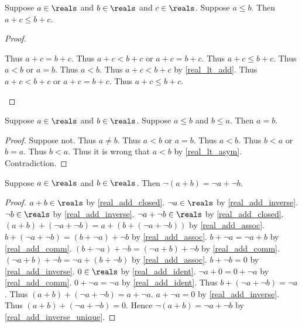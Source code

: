 \begin{lemma}\label{real_leq_add}
    Suppose $a\in\reals$ and $b\in\reals$ and $c\in\reals$.
    Suppose $a \leq b$.
    Then $a + c \leq b + c$.
\end{lemma}
\begin{proof}
    \begin{byCase}
        Thus $a + c = b + c$.
        Thus $a + c < b + c$ or $a + c = b + c$.
        Thus $a + c \leq b + c$.
        Thus $a < b$ or $a = b$.
        Thus $a < b$.
        Thus $a + c < b + c$ by \cref{real_lt_add}.
        Thus $a + c < b + c$ or $a + c = b + c$.
        Thus $a + c \leq b + c$.
    \end{byCase}
\end{proof}

\begin{lemma}\label{real_leq_antisym}
    Suppose $a\in\reals$ and $b\in\reals$.
    Suppose $a \leq b$ and $b \leq a$.
    Then $a = b$.
\end{lemma}
\begin{proof}
    Suppose not.
    Thus $a \neq b$.
    Thus $a < b$ or $a = b$.
    Thus $a < b$.
    Thus $b < a$ or $b = a$.
    Thus $b < a$.
    Thus it is wrong that $a < b$ by \cref{real_lt_asym}.
    Contradiction.
\end{proof}

\begin{lemma}\label{real_neg_addition}
    Suppose $a\in\reals$ and $b\in\reals$.
    Then $\neg{(a + b)} = \neg{a} + \neg{b}$.
\end{lemma}
\begin{proof}
    $a + b\in\reals$ by \cref{real_add_closed}.
    $\neg{a}\in\reals$ by \cref{real_add_inverse}.
    $\neg{b}\in\reals$ by \cref{real_add_inverse}.
    $\neg{a} + \neg{b}\in\reals$ by \cref{real_add_closed}.
    $(a + b) + (\neg{a} + \neg{b}) = a + (b + (\neg{a} + \neg{b}))$ by \cref{real_add_assoc}.
    $b + (\neg{a} + \neg{b}) = (b + \neg{a}) + \neg{b}$ by \cref{real_add_assoc}.
    $b + \neg{a} = \neg{a} + b$ by \cref{real_add_comm}.
    $(b + \neg{a}) + \neg{b} = (\neg{a} + b) + \neg{b}$ by \cref{real_add_comm}.
    $(\neg{a} + b) + \neg{b} = \neg{a} + (b + \neg{b})$ by \cref{real_add_assoc}.
    $b + \neg{b} = 0$ by \cref{real_add_inverse}.
    $0\in\reals$ by \cref{real_add_ident}.
    $\neg{a} + 0 = 0 + \neg{a}$ by \cref{real_add_comm}.
    $0 + \neg{a} = \neg{a}$ by \cref{real_add_ident}.
    Thus $b + (\neg{a} + \neg{b}) = \neg{a}$.
    Thus $(a + b) + (\neg{a} + \neg{b}) = a + \neg{a}$.
    $a + \neg{a} = 0$ by \cref{real_add_inverse}.
    Thus $(a + b) + (\neg{a} + \neg{b}) = 0$.
    Hence $\neg{(a + b)} = \neg{a} + \neg{b}$ by \cref{real_add_inverse_unique}.
\end{proof}

